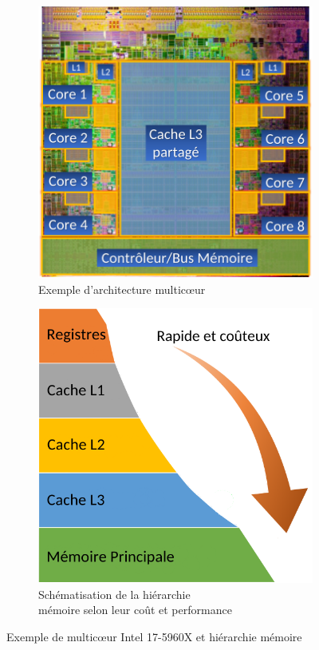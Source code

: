 \documentclass[french, a4paper, 11pt, twoside, pdftex]{StyleThese}
\begin{document}
		\begin{figure}[h!]
			\centering
			\begin{subfigure}{.42\textwidth} \centering
				\includegraphics[width=0.9\linewidth]{schemas/multicoeurIntel}
				\caption{Exemple d'architecture multicœur}
				\label{fig:multicoeurintel}
			\end{subfigure}			
			\begin{subfigure}{.45\textwidth} \centering
				\includegraphics[width=0.85\linewidth]{schemas/hierarchieMemoire}
				\caption[Hiérarchie mémoire]{Schématisation de la hiérarchie \\mémoire selon leur coût et performance}
				\label{fig:hierarchiememoire}
			\end{subfigure}
			\caption{Exemple de multicœur Intel 17-5960X et hiérarchie mémoire}
			\label{fig:multicoeurs}
		\end{figure}
			
\end{document}
